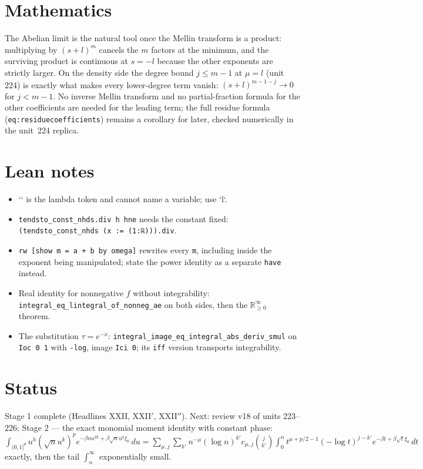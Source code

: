 \documentclass[11pt]{article}
\begin{document}
\section{Mathematics}
The Abelian limit is the natural tool once the Mellin transform is a product: multiplying by
$(s+l)^m$ cancels the $m$ factors at the minimum, and the surviving product is continuous at $s=-l$
because the other exponents are strictly larger. On the density side the degree bound $j\le m-1$ at
$\mu=l$ (unit 224) is exactly what makes every lower-degree term vanish: $(s+l)^{m-1-j}\to0$ for
$j<m-1$. No inverse Mellin transform and no partial-fraction formula for the other coefficients are
needed for the leading term; the full residue formula (\texttt{eq:residuecoefficients}) remains a
corollary for later, checked numerically in the unit~224 replica.

\section{Lean notes}
\begin{itemize}
\item `\lambda` is the lambda token and cannot name a variable; use `l`.
\item \texttt{tendsto\_const\_nhds.div h hne} needs the constant fixed: \texttt{(tendsto\_const\_nhds (x := (1:ℝ))).div}.
\item \texttt{rw [show m = a + b by omega]} rewrites every \texttt{m}, including inside the exponent
  being manipulated; state the power identity as a separate \texttt{have} instead.
\item Real identity for nonnegative $f$ without integrability: \texttt{integral\_eq\_lintegral\_of\_nonneg\_ae}
  on both sides, then the $\mathbb R_{\ge0}^\infty$ theorem.
\item The substitution $\tau=e^{-x}$: \texttt{integral\_image\_eq\_integral\_abs\_deriv\_smul} on
  \texttt{Ioc 0 1} with \texttt{-log}, image \texttt{Ici 0}; its \texttt{iff} version transports integrability.
\end{itemize}

\section{Status}
Stage 1 complete (Headlines XXII, XXII$'$, XXII$''$). Next: review v18 of units 223--226; Stage 2 --- the
exact monomial moment identity with constant phase: $\int_{(0,1]^d}u^{h}(\sqrt n u^k)^p
e^{-\beta nu^{2k}+\beta\sqrt n u^k\xi_0}\,du=\sum_{\mu,j}\sum_{k'}n^{-\mu}(\log n)^{k'}c_{\mu,j}
\binom{j}{k'}\int_0^{n}t^{\mu+p/2-1}(-\log t)^{j-k'}e^{-\beta t+\beta\sqrt t\xi_0}\,dt$ exactly, then the
tail $\int_n^\infty$ exponentially small.
\end{document}
